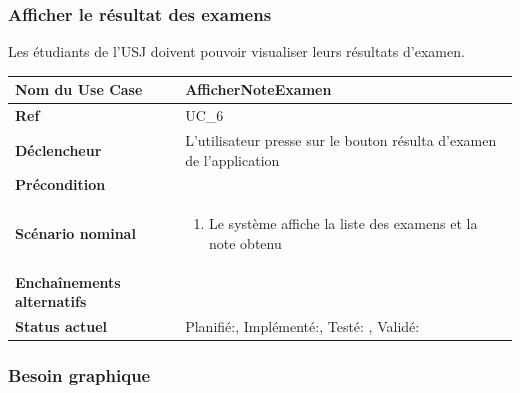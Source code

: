 			\subsubsection{Afficher le résultat des examens}
								Les étudiants de l'USJ doivent pouvoir visualiser leurs résultats d'examen.\\[0.2cm]
								\begin{longtable}{|l|p{10cm}|}
									\hline \textbf{Nom du Use Case} & AfficherNoteExamen \\ 
									\hline \textbf{Ref} & UC\_6  \\ 
									\hline \textbf{Déclencheur} & L'utilisateur presse sur le bouton résulta d'examen  de l'application \\
									\hline \textbf{Précondition} &  \\
									\hline \textbf{Scénario nominal} & 
									\begin{enumerate}
										\item Le système affiche la liste des examens et la note obtenu 
									\end{enumerate}
									\\ 
									\hline \textbf{Enchaînements alternatifs} & \\
									\hline \textbf{Status actuel} & Planifié:\CheckedBox , Implémenté:\CheckedBox  , Testé: \CheckedBox  , Validé: \CheckedBox	  \\
									\hline 
								\end{longtable} 
						\subsubsection*{Besoin graphique}
			
								
		

